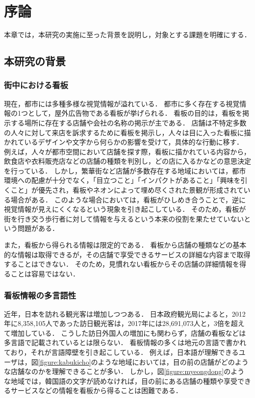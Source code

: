 \chapter{序論}
\label{chapter:introduction}

本章では，本研究の実施に至った背景を説明し，対象とする課題を明確にする．

\section{本研究の背景}
  \subsection{街中における看板}
  \label{subsection:signboards_in_town}
    現在，都市には多種多様な視覚情報が溢れている．
    都市に多く存在する視覚情報の1つとして，屋外広告物である看板が挙げられる．
    看板の目的は，看板を掲示する場所に存在する店舗や会社の名称の掲示が主である．
    店舗は不特定多数の人々に対して来店を訴求するために看板を掲示し，人々は目に入った看板に描かれているデザインや文字から何らかの影響を受けて，具体的な行動に移す\cite{Koyama:2016}．
    例えば，人々が都市空間において店舗を探す際，看板に描かれている内容から，飲食店や衣料販売店などの店舗の種類を判別し，どの店に入るかなどの意思決定を行っている．
    しかし，繁華街など店舗が多数存在する地域においては，都市環境への配慮が十分でなく，「目立つこと」「インパクトがあること」「興味を引くこと」が優先され，看板やネオンによって埋め尽くされた景観が形成されている場合がある\cite{Yokokawa:2000}．
    このような場合においては，看板がひしめき合うことで，逆に視覚情報が見えにくくなるという現象を引き起こしている\cite{Watanabe:2003}．
    そのため，看板が街を行き交う歩行者に対して情報を与えるという本来の役割を果たせていないという問題がある．

    また，看板から得られる情報は限定的である．
    看板から店舗の種類などの基本的な情報は取得できるが，その店舗で享受できるサービスの詳細な内容まで取得することはできない．
    そのため，見慣れない看板からその店舗の詳細情報を得ることは容易ではない．

  \subsection{看板情報の多言語性}
    近年，日本を訪れる観光客は増加しつつある．
    日本政府観光局によると，2012年に8,358,105人であった訪日観光客は，2017年には28,691,073人と，3倍を超えて増加している\cite{JNTO:2018}．
    こうした訪日外国人の増加にも関わらず，店舗の看板などは多言語で記載されているとは限らない．
    看板情報の多くは地元の言語で書かれており，それが言語障壁を引き起こしている．
    例えば，日本語が理解できるユーザは，図\ref{figure:kabukicho}のような地域においては，目の前の店舗がどのような店舗なのかを理解できることが多い．
    しかし，図\ref{figure:myeongdong}のような地域では，韓国語の文字が読めなければ，目の前にある店舗の種類や享受できるサービスなどの情報を看板から得ることは困難である．

